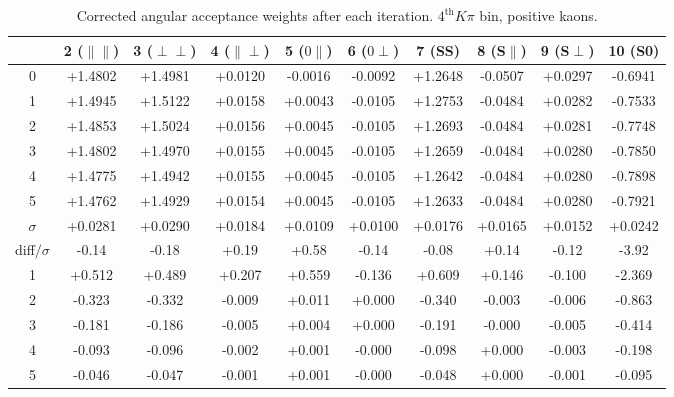 \begin{table}[h!]
    \center\footnotesize
 \caption{\small Corrected angular acceptance weights after each iteration. $4^{\text{th}}K\pi$ bin, positive kaons.}   
     \begin{tabular}{c c c c c c c c c c }
            & 2 ($\parallel\parallel$) & 3 ($\perp\perp$) & 4 ($\parallel\perp$) & 5 ($0\parallel$) & 
            6 ($0\perp$) & 7 (SS) & 8 (S$\parallel$) & 9 (S$\perp$) & 10 (S0) \\
            \hline
      0 & +1.4802 & +1.4981 & +0.0120 & -0.0016 & -0.0092 & +1.2648 & -0.0507 & +0.0297 & -0.6941\\
      1 & +1.4945 & +1.5122 & +0.0158 & +0.0043 & -0.0105 & +1.2753 & -0.0484 & +0.0282 & -0.7533\\
      2 & +1.4853 & +1.5024 & +0.0156 & +0.0045 & -0.0105 & +1.2693 & -0.0484 & +0.0281 & -0.7748\\
      3 & +1.4802 & +1.4970 & +0.0155 & +0.0045 & -0.0105 & +1.2659 & -0.0484 & +0.0280 & -0.7850\\
      4 & +1.4775 & +1.4942 & +0.0155 & +0.0045 & -0.0105 & +1.2642 & -0.0484 & +0.0280 & -0.7898\\
      5 & +1.4762 & +1.4929 & +0.0154 & +0.0045 & -0.0105 & +1.2633 & -0.0484 & +0.0280 & -0.7921\\
     \hline
      $\sigma$ & +0.0281 & +0.0290 & +0.0184 & +0.0109 & +0.0100 & +0.0176 & +0.0165 & +0.0152 & +0.0242\\
     diff$/\sigma$& -0.14  & -0.18  & +0.19  & +0.58  & -0.14  & -0.08  & +0.14  & -0.12  & -3.92 \\
            \hline
      1 & +0.512  & +0.489  & +0.207  & +0.559  & -0.136  & +0.609  & +0.146  & -0.100  & -2.369 \\
      2 & -0.323  & -0.332  & -0.009  & +0.011  & +0.000  & -0.340  & -0.003  & -0.006  & -0.863 \\
      3 & -0.181  & -0.186  & -0.005  & +0.004  & +0.000  & -0.191  & -0.000  & -0.005  & -0.414 \\
      4 & -0.093  & -0.096  & -0.002  & +0.001  & -0.000  & -0.098  & +0.000  & -0.003  & -0.198 \\
      5 & -0.046  & -0.047  & -0.001  & +0.001  & -0.000  & -0.048  & +0.000  & -0.001  & -0.095 \\
     \end{tabular}
     \label{tab:norm_weights_evolution_4}
\end{table}
